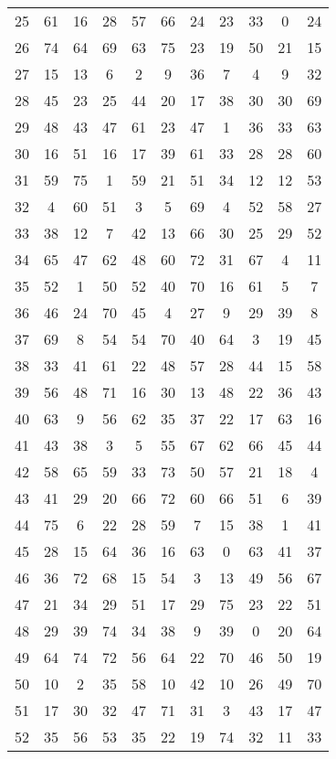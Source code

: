 \begin{table}
\begin{tabular}{c c c c c c c c c c c }
25 & 61 & 16 & 28 & 57 & 66 & 24 & 23 & 33 & 0 & 24 \\
26 & 74 & 64 & 69 & 63 & 75 & 23 & 19 & 50 & 21 & 15 \\
27 & 15 & 13 & 6 & 2 & 9 & 36 & 7 & 4 & 9 & 32 \\
28 & 45 & 23 & 25 & 44 & 20 & 17 & 38 & 30 & 30 & 69 \\
29 & 48 & 43 & 47 & 61 & 23 & 47 & 1 & 36 & 33 & 63 \\
30 & 16 & 51 & 16 & 17 & 39 & 61 & 33 & 28 & 28 & 60 \\
31 & 59 & 75 & 1 & 59 & 21 & 51 & 34 & 12 & 12 & 53 \\
32 & 4 & 60 & 51 & 3 & 5 & 69 & 4 & 52 & 58 & 27 \\
33 & 38 & 12 & 7 & 42 & 13 & 66 & 30 & 25 & 29 & 52 \\
34 & 65 & 47 & 62 & 48 & 60 & 72 & 31 & 67 & 4 & 11 \\
35 & 52 & 1 & 50 & 52 & 40 & 70 & 16 & 61 & 5 & 7 \\
36 & 46 & 24 & 70 & 45 & 4 & 27 & 9 & 29 & 39 & 8 \\
37 & 69 & 8 & 54 & 54 & 70 & 40 & 64 & 3 & 19 & 45 \\
38 & 33 & 41 & 61 & 22 & 48 & 57 & 28 & 44 & 15 & 58 \\
39 & 56 & 48 & 71 & 16 & 30 & 13 & 48 & 22 & 36 & 43 \\
40 & 63 & 9 & 56 & 62 & 35 & 37 & 22 & 17 & 63 & 16 \\
41 & 43 & 38 & 3 & 5 & 55 & 67 & 62 & 66 & 45 & 44 \\
42 & 58 & 65 & 59 & 33 & 73 & 50 & 57 & 21 & 18 & 4 \\
43 & 41 & 29 & 20 & 66 & 72 & 60 & 66 & 51 & 6 & 39 \\
44 & 75 & 6 & 22 & 28 & 59 & 7 & 15 & 38 & 1 & 41 \\
45 & 28 & 15 & 64 & 36 & 16 & 63 & 0 & 63 & 41 & 37 \\
46 & 36 & 72 & 68 & 15 & 54 & 3 & 13 & 49 & 56 & 67 \\
47 & 21 & 34 & 29 & 51 & 17 & 29 & 75 & 23 & 22 & 51 \\
48 & 29 & 39 & 74 & 34 & 38 & 9 & 39 & 0 & 20 & 64 \\
49 & 64 & 74 & 72 & 56 & 64 & 22 & 70 & 46 & 50 & 19 \\
50 & 10 & 2 & 35 & 58 & 10 & 42 & 10 & 26 & 49 & 70 \\
51 & 17 & 30 & 32 & 47 & 71 & 31 & 3 & 43 & 17 & 47 \\
52 & 35 & 56 & 53 & 35 & 22 & 19 & 74 & 32 & 11 & 33 \\

\end{tabular}
\end{table}
